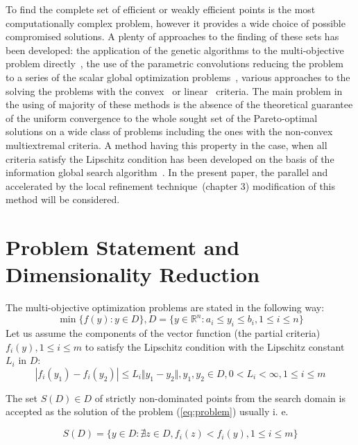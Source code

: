 \documentclass{llncs}
\begin{document}
To find the complete set of efficient or weakly efficient points is the most computationally
complex problem, however it provides a wide choice of possible compromised solutions. A
plenty of approaches to the finding of these sets has been developed: the application of the
genetic algorithms to the multi-objective problem directly~\cite{DebPratap2002}, the use of the
parametric convolutions reducing the problem to a series of the scalar global optimization
problems~\cite{GergelKozinov2017}, various approaches to the solving the problems with the
convex~ \cite{ZhangZuo2013} or linear~\cite{Benson1998} criteria. The main problem in the
using of majority of these methods is the absence of the theoretical guarantee of the uniform
convergence to the whole sought set of the Pareto-optimal solutions on a wide class of
problems including the ones with the non-convex multiextremal criteria. A method having this
property in the case, when all criteria satisfy the Lipschitz condition has been developed on the
basis of the information global search algorithm~\cite{markinStrongin1993}. In the present
paper, the parallel and accelerated by the local refinement technique~\cite{strOptBook}(chapter
3) modification of this method will be considered.

\section{Problem Statement and Dimensionality Reduction}
The multi-objective optimization problems are stated in the following way:
\begin{equation}
  \label{eq:problem}
  \min\{f(y): y\in D\}, D=\{y\in \mathbb{R}^n: a_i \leqslant y_i \leqslant b_i, 1\leqslant i
\leqslant n \}
\end{equation}
Let us assume the components of the vector function (the partial criteria) \(f_i(y), 1\leqslant
i\leqslant m\) to satisfy the Lipschitz condition with the Lipschitz constant \(L_i\) in \(D\):
\begin{displaymath}
\label{lip}
|f_i(y_1)-f_i(y_2)|\leqslant L_i\Vert y_1-y_2\Vert,y_1,y_2\in D,0<L_i<\infty,1\leqslant i
\leqslant m
\end{displaymath}

The set \(S(D)\in D\) of strictly non-dominated points from the search domain is accepted as the
solution of the problem (\ref{eq:problem}) usually i. e.

\begin{equation}
  \label{eq:slater}
  S(D) = \{y\in D: \nexists z\in D, f_i(z)<f_i(y),1\leqslant i \leqslant m\}
\end{equation}
\end{document}

